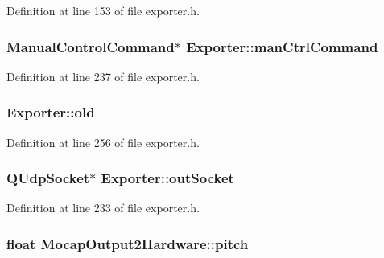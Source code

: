 \-Definition at line 153 of file exporter.\-h.

\hypertarget{group___mo_cap_plugin_ga8855725831e82f6e02e0caba72c0dd7b}{
\subsubsection[{man\-Ctrl\-Command}]{\setlength{\rightskip}{0pt plus 5cm}\-Manual\-Control\-Command$\ast$ {\bf \-Exporter\-::man\-Ctrl\-Command}}}\label{group___mo_cap_plugin_ga8855725831e82f6e02e0caba72c0dd7b}


\-Definition at line 237 of file exporter.\-h.

\hypertarget{group___mo_cap_plugin_ga5ef84da1bd9cf4e1d625c33beb5a148c}{
\subsubsection[{old}]{ {\bf \-Exporter\-::old}}}\label{group___mo_cap_plugin_ga5ef84da1bd9cf4e1d625c33beb5a148c}


\-Definition at line 256 of file exporter.\-h.

\hypertarget{group___mo_cap_plugin_gad4adc615f73413f479e48983cce6f3e0}{
\subsubsection[{out\-Socket}]{\setlength{\rightskip}{0pt plus 5cm}\-Q\-Udp\-Socket$\ast$ {\bf \-Exporter\-::out\-Socket}}}\label{group___mo_cap_plugin_gad4adc615f73413f479e48983cce6f3e0}


\-Definition at line 233 of file exporter.\-h.

\hypertarget{group___mo_cap_plugin_ga5e6750ec09f6ef2ebd014c746421e952}{
\subsubsection[{pitch}]{\setlength{\rightskip}{0pt plus 5cm}float {\bf \-Mocap\-Output2\-Hardware\-::pitch}}}\label{group___mo_cap_plugin_ga5e6750ec09f6ef2ebd014c746421e952}


